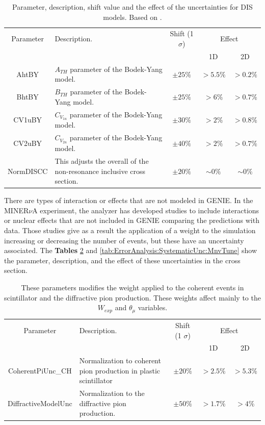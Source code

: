 \begin{table}[!htb]
    \centering
    \begin{tabular}{c|p{2.1in}|c|c|c}
        \hline 
        Parameter & Description.  & Shift (1 $\sigma$) & \multicolumn{2}{c}{Effect} \\
         & & & 1D & 2D \\
        \hline  
        AhtBY & $A_{TH}$ parameter of the Bodek-Yang model. & $\pm25\%$ & $>5.5\%$ & $>0.2\%$\\ \hline
        BhtBY & $B_{TH}$ parameter of the Bodek-Yang model. & $\pm25\%$ & $>6\%$ & $>0.7\%$ \\ \hline
        CV1uBY & $C_{V_{1u}}$ parameter of the Bodek-Yang model. & $\pm30\%$ & $>2\%$ & $>0.8\%$ \\ \hline
        CV2uBY & $C_{V_{2u}}$ parameter of the Bodek-Yang model. & $\pm40\%$ & $>2\%$ & $>0.7\%$ \\ \hline
        NormDISCC & This adjusts the overall of the non-resonance inclusive cross section. & $\pm20\%$ & $\sim0\%$ & $\sim0\%$ \\ \hline 
    \end{tabular}
    \caption{Parameter, description, shift value and the effect of the uncertainties for DIS models. Based on \cite{GENIEUnc}.}
    \label{tab:ErrorAnalysis:SystematicUnc:GenieDISmodels}
\end{table}

There are types of interaction or effects that are not modeled in GENIE. In the MINER$\nu$A experiment, the analyzer has developed studies to include interactions or nuclear effects that are not included in GENIE comparing the predictions with data. Those studies give as a result the application of a weight to the simulation increasing or decreasing the number of events, but these have an uncertainty associated. The \textbf{Tables} \ref{tab:ErrorAnalysis:SystematicUnc:CoherentandDifractive} and \ref{tab:ErrorAnalysis:SystematicUnc:MnvTune} show the parameter, description, and the effect of these uncertainties in the cross section.

\begin{table}[!htb]
    \centering
    \begin{tabular}{c|p{2in}|c|c|c}
        \hline 
        Parameter & Description.  & Shift (1 $\sigma$) & \multicolumn{2}{c}{Effect} \\
         & & & 1D & 2D \\
        \hline  
        CoherentPiUnc\_CH & Normalization to coherent pion production in plastic scintillator & $\pm20\%$ & $>2.5\%$ & $>5.3\%$\\ \hline
        DiffractiveModelUnc & Normalization to the diffractive pion production. & $\pm50\%$ & $>1.7\%$ & $>4\%$ \\ \hline 
    \end{tabular}
    \caption{These parameters modifies the weight applied to the coherent events in scintillator and the diffractive pion production. These weights affect mainly to the $W_{exp}$ and $\theta_\mu$ variables.}
    \label{tab:ErrorAnalysis:SystematicUnc:CoherentandDifractive}
\end{table}

